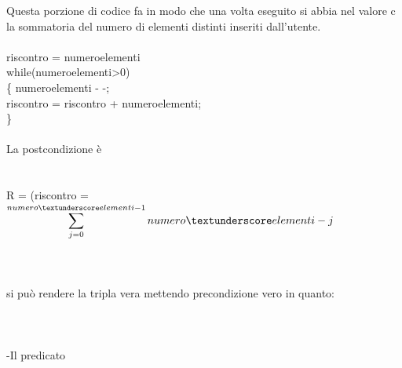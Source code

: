 \documentclass[11pt, a4paper, titlepage, block]{article}
\begin{document}
Questa porzione di codice fa in modo che una volta eseguito si abbia nel valore c la sommatoria del numero di elementi distinti inseriti dall'utente.	
\\
\\
riscontro = numero\textunderscore elementi\\	
while(numero\textunderscore elementi\textgreater 0)\\
\{
numero\textunderscore elementi - -;\\
riscontro = riscontro + numero\textunderscore elementi;\\
\}
\\
\\
La postcondizione \`e 
\\
\\
\\
R = (riscontro = $\displaystyle \sum_{j=0}^{numero\textunderscore elementi-1} numero\textunderscore elementi - j $\\
\\
\\
\\
si può rendere la tripla vera mettendo precondizione vero  in quanto:\\
\\
\\
\\
 -Il predicato
 
\end{document}
